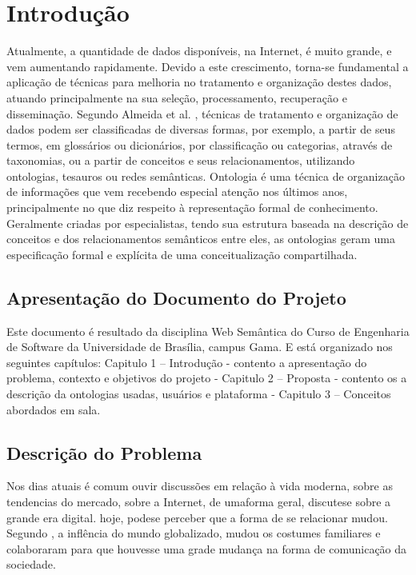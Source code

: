 \chapter[Introdução]{Introdução}\label{cap1}
		
Atualmente, a quantidade de dados disponíveis, na Internet, é muito grande, e vem aumentando rapidamente. Devido a este crescimento, torna-se fundamental a aplicação de técnicas para melhoria no tratamento e organização destes dados, atuando principalmente na sua seleção, processamento, recuperação e disseminação.
Segundo Almeida et al. \cite{UVG}, técnicas de tratamento e organização de dados podem ser classificadas de diversas formas, por exemplo, a partir de seus termos, em glossários ou dicionários, por classificação ou categorias, através de taxonomias, ou a partir de conceitos e seus relacionamentos, utilizando ontologias, tesauros ou redes semânticas.\cite{TSW}
Ontologia é uma técnica de organização de informações que vem recebendo especial atenção nos últimos anos, principalmente no que diz respeito à representação formal de conhecimento. Geralmente criadas por especialistas, tendo sua estrutura baseada na descrição de conceitos e dos relacionamentos semânticos entre eles, as ontologias geram uma especificação formal e explícita de uma conceitualização compartilhada.

\section{Apresentação do Documento do Projeto}

Este documento é resultado da disciplina Web Semântica do Curso de Engenharia de Software da Universidade de Brasília, campus Gama. E está organizado nos seguintes capítulos: Capitulo 1 – Introdução - contento a apresentação do problema, contexto e objetivos do projeto -  Capitulo 2 – Proposta - contento os a descrição da ontologias usadas, usuários e plataforma - Capitulo 3 – Conceitos abordados em sala.

\section{Descrição do Problema}
Nos dias atuais é comum ouvir discussões em relação à vida moderna, sobre as tendencias do mercado, sobre a Internet, de umaforma geral, discutese sobre a grande era digital. hoje, podese perceber que a forma de se relacionar mudou. Segundo \cite{FA}, a inflência do mundo globalizado, mudou os costumes familiares e colaboraram para que houvesse uma grade mudança na forma de comunicação da sociedade.

